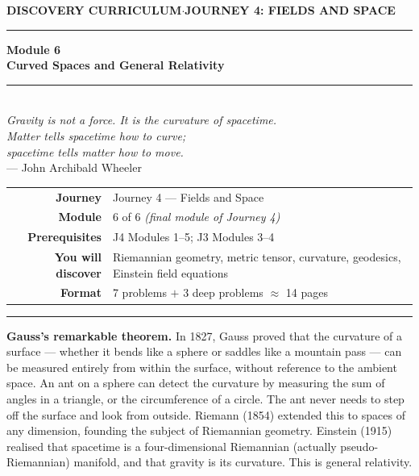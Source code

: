 \documentclass[12pt,a4paper]{article}
\newcounter{problem}
\begin{document}
\thispagestyle{empty}
\begin{center}
{\small\color{MidBlue}\textbf{DISCOVERY CURRICULUM}\quad$\cdot$\quad\textbf{JOURNEY 4: FIELDS AND SPACE}}
\vspace{0.6cm}

{\color{NavyBlue}\rule{\linewidth}{2pt}}\vspace{0.5cm}

{\Huge\bfseries\color{NavyBlue}Module 6}\\[0.3cm]
{\LARGE\bfseries\color{MidBlue}Curved Spaces and General Relativity}\\[0.4cm]
{\color{Gold}\rule{0.4\linewidth}{1.2pt}}\\[0.4cm]
{\large\itshape\color{DarkGrey}
Gravity is not a force. It is the curvature of spacetime.\\[0.15cm]
Matter tells spacetime how to curve;\\[0.15cm]
spacetime tells matter how to move.}\\[0.2cm]
{\footnotesize\color{DarkGrey}--- John Archibald Wheeler}

\vspace{0.9cm}
\begin{tabular}{rl}
\color{DarkGrey}\textbf{Journey}           & Journey 4 --- Fields and Space \\[4pt]
\color{DarkGrey}\textbf{Module}            & 6 of 6 \textit{(final module of Journey 4)} \\[4pt]
\color{DarkGrey}\textbf{Prerequisites}     & J4 Modules 1--5; J3 Modules 3--4 \\[4pt]
\color{DarkGrey}\textbf{You will discover} & Riemannian geometry, metric tensor, curvature, geodesics, Einstein field equations \\[4pt]
\color{DarkGrey}\textbf{Format}            & 7 problems $+$ 3 deep problems $\approx$ 14 pages \\
\end{tabular}
\vspace{1cm}

{\color{NavyBlue}\rule{\linewidth}{2pt}}
\end{center}

\vspace{0.5cm}
\noindent\textbf{Gauss's remarkable theorem.}
In 1827, Gauss proved that the curvature of a surface --- whether it bends like a sphere or saddles like a mountain pass --- can be measured entirely from within the surface, without reference to the ambient space. An ant on a sphere can detect the curvature by measuring the sum of angles in a triangle, or the circumference of a circle. The ant never needs to step off the surface and look from outside. Riemann (1854) extended this to spaces of any dimension, founding the subject of Riemannian geometry. Einstein (1915) realised that spacetime is a four-dimensional Riemannian (actually pseudo-Riemannian) manifold, and that gravity is its curvature. This is general relativity.
\end{document}
